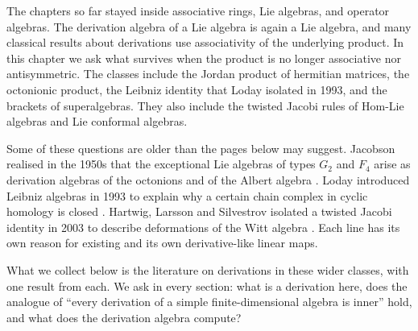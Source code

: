 The chapters so far stayed inside associative rings, Lie algebras, and
operator algebras. The derivation algebra of a Lie algebra is again a Lie
algebra, and many classical results about derivations use associativity of
the underlying product. In this chapter we ask what survives when the
product is no longer associative nor antisymmetric. The classes include
the Jordan product of hermitian matrices, the octonionic product, the
Leibniz identity that Loday isolated in 1993, and the brackets of
superalgebras. They also include the twisted Jacobi rules of Hom-Lie
algebras and Lie conformal algebras.

Some of these questions are older than the pages below may suggest.
Jacobson realised in the 1950s that the exceptional Lie algebras of types
$G_2$ and $F_4$ arise as derivation algebras of the octonions and of the
Albert algebra \cite[p.~52]{McCrimmon2004Taste}. Loday introduced Leibniz
algebras in 1993 to explain why a certain chain complex in cyclic homology
is closed \cite[p.~139]{LodayPirashvili1993}. Hartwig, Larsson and
Silvestrov isolated a twisted Jacobi identity in 2003 to describe
deformations of the Witt algebra
\cite[p.~1]{HartwigLarssonSilvestrov2006}. Each line has its own reason
for existing and its own derivative-like linear maps.

What we collect below is the literature on derivations in these wider
classes, with one result from each. We ask in every section: what is a
derivation here, does the analogue of ``every derivation of a simple
finite-dimensional algebra is inner'' hold, and what does the derivation
algebra compute?

